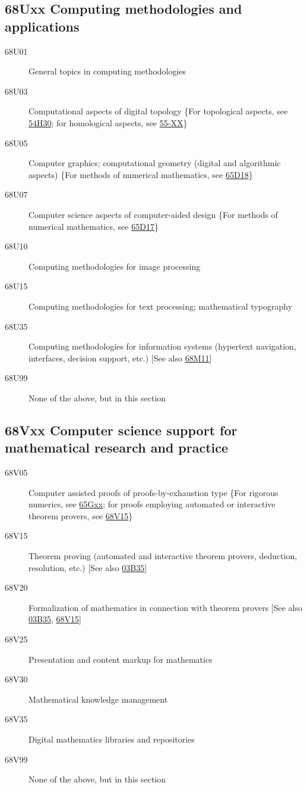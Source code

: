 \subsection*{68Uxx  Computing methodologies and applications }\label{68Uxx}
\begin{description}
\item [68U01]\label{68U01} General topics in computing methodologies
\item [68U03]\label{68U03} Computational aspects of digital topology \{For topological aspects, see \hyperref[54H30]{54H30}; for homological aspects, see \hyperref[55-XX]{55-XX}\}
\item [68U05]\label{68U05} Computer graphics; computational geometry (digital and algorithmic aspects) \{For methods of numerical mathematics, see \hyperref[65D18]{65D18}\}
\item [68U07]\label{68U07} Computer science aspects of computer-aided design \{For methods of numerical mathematics, see \hyperref[65D17]{65D17}\}
\item [68U10]\label{68U10} Computing methodologies for image processing
\item [68U15]\label{68U15} Computing methodologies for text processing; mathematical typography
\item [68U35]\label{68U35} Computing methodologies for information systems (hypertext navigation, interfaces, decision support, etc.) [See also \hyperref[68M11]{68M11}]
\item [68U99]\label{68U99} None of the above, but in this section
\end{description}
\subsection*{68Vxx  Computer science support for mathematical research and practice }\label{68Vxx}
\begin{description}
\item [68V05]\label{68V05} Computer assisted proofs of proofs-by-exhaustion type \{For rigorous numerics, see \hyperref[65Gxx]{65Gxx}; for proofs employing automated or interactive theorem provers, see \hyperref[68V15]{68V15}\}
\item [68V15]\label{68V15} Theorem proving (automated and interactive theorem provers, deduction, resolution, etc.) [See also \hyperref[03B35]{03B35}]
\item [68V20]\label{68V20} Formalization of mathematics in connection with theorem provers [See also \hyperref[03B35]{03B35}, \hyperref[68V15]{68V15}]
\item [68V25]\label{68V25} Presentation and content markup for mathematics
\item [68V30]\label{68V30} Mathematical knowledge management
\item [68V35]\label{68V35} Digital mathematics libraries and repositories
\item [68V99]\label{68V99} None of the above, but in this section
\end{description}

